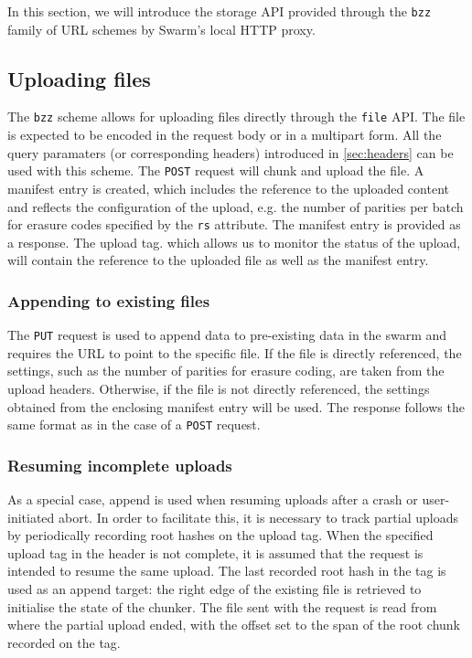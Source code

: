 In this section, we will introduce the storage API provided through the \lstinline{bzz} family of URL schemes by Swarm's local HTTP proxy.

\subsection{Uploading files \statusgreen}\label{sec:file-api}

The \lstinline{bzz} scheme allows for uploading files directly through the \lstinline{file} API. The file is expected to be encoded in the request body or in a multipart form. All the query paramaters (or corresponding headers)  introduced in \ref{sec:headers} can be used with this scheme. The \lstinline{POST} request will chunk and upload the file. A manifest entry is created, which includes the reference to the uploaded content and reflects the configuration of the upload, e.g. the number of parities per batch for erasure codes specified by the \lstinline{rs} attribute.
The manifest entry is provided as a response. The upload tag. which allows us to monitor the status of the upload, will contain the reference to the uploaded file as well as the manifest entry.

\subsubsection{Appending to existing files}\label{sec:append}

The \lstinline{PUT} request is used to append data to pre-existing data in the swarm and requires the URL to point to the specific file. If the file is directly referenced, the settings, such as the number of parities for erasure coding, are taken from the upload headers. Otherwise, if the file is not directly referenced, the settings obtained from the enclosing manifest entry will be used. The response follows the same format as in the case of a \lstinline{POST} request.


\subsubsection{Resuming incomplete uploads}\label{sec:resume}

As a special case, append is used when resuming uploads after a crash or user-initiated abort. In order to facilitate this, it is necessary to track partial uploads by periodically recording root hashes on the upload tag. When the specified upload tag in the header is not complete, it is assumed that the request is intended to resume the same upload. The last recorded root hash in the tag is used as an append target: the right edge of the existing file is retrieved to initialise the state of the chunker. The file sent with the request is read from where the partial upload ended, with the offset set to the span of the root chunk recorded on the tag.

